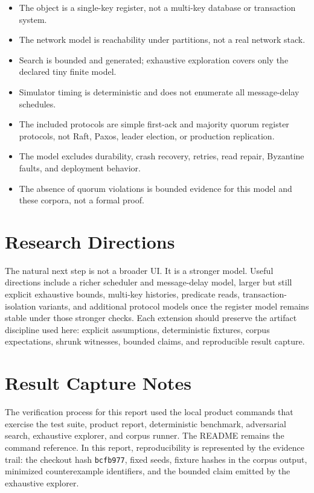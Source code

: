\documentclass[10pt]{article}
\newcommand{\firstack}{first-ack}
\newcommand{\quorum}{quorum}
\begin{document}
\begin{itemize}
  \item The object is a single-key register, not a multi-key database or transaction system.
  \item The network model is reachability under partitions, not a real network stack.
  \item Search is bounded and generated; exhaustive exploration covers only the declared tiny
  finite model.
  \item Simulator timing is deterministic and does not enumerate all message-delay schedules.
  \item The included protocols are simple \firstack{} and majority \quorum{} register protocols,
  not Raft, Paxos, leader election, or production replication.
  \item The model excludes durability, crash recovery, retries, read repair, Byzantine faults,
  and deployment behavior.
  \item The absence of \quorum{} violations is bounded evidence for this model and these corpora,
  not a formal proof.
\end{itemize}

\section{Research Directions}

The natural next step is not a broader UI. It is a stronger model. Useful directions include a
richer scheduler and message-delay model, larger but still explicit exhaustive bounds, multi-key
histories, predicate reads, transaction-isolation variants, and additional protocol models once
the register model remains stable under those stronger checks. Each extension should preserve the
artifact discipline used here: explicit assumptions, deterministic fixtures, corpus expectations,
shrunk witnesses, bounded claims, and reproducible result capture.

\appendix
\section{Result Capture Notes}

The verification process for this report used the local product commands that exercise the test
suite, product report, deterministic benchmark, adversarial search, exhaustive explorer, and
corpus runner. The README remains the command reference. In this report, reproducibility is
represented by the evidence trail: the checkout hash \texttt{bcfb977}, fixed seeds, fixture
hashes in the corpus output, minimized counterexample identifiers, and the bounded claim emitted
by the exhaustive explorer.
\end{document}
